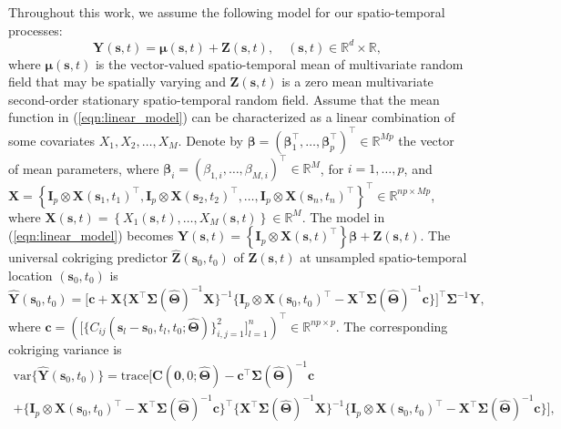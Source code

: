 \documentclass[12pt]{article}
\newcommand{\0}{\mathbf{0}}
\begin{document}
Throughout this work, we assume the following model for our spatio-temporal processes:
\begin{equation} \label{eqn:linear_model}
\mathbf{Y}(\mathbf{s},t) = \boldsymbol{\mu}(\mathbf{s}, t) + \mathbf{Z}(\mathbf{s},t),\quad (\mathbf{s},t)\in \mathbb{R}^d\times \mathbb{R},
\end{equation}
where $\boldsymbol{\mu}(\mathbf{s}, t)$ is the vector-valued spatio-temporal mean of multivariate random field that may be spatially varying and $\mathbf{Z}(\mathbf{s},t)$ is a zero mean multivariate second-order stationary spatio-temporal random field. Assume that the mean function in (\ref{eqn:linear_model}) can be characterized as a linear combination of some covariates $X_1, X_2, \ldots, X_M$. Denote by $\boldsymbol{\beta} = (\boldsymbol{\beta}_1^{\top}, \ldots, \boldsymbol{\beta}_p^{\top})^{\top} \in \mathbb{R}^{Mp}$ the vector of mean parameters, where $\boldsymbol{\beta}_i = (\beta_{1, i}, \ldots, \beta_{M, i})^{\top} \in \mathbb{R}^{M}$, for $i = 1, \ldots, p$, and $\mathbf{X} = \left\{ \mathbf{I}_p \otimes  \mathbf{X}(\mathbf{s}_1, t_1)^{\top}, \mathbf{I}_p \otimes \mathbf{X}(\mathbf{s}_2, t_2)^{\top}, \ldots, \mathbf{I}_p \otimes \mathbf{X}(\mathbf{s}_n, t_n)^{\top} \right\}^{\top} \in \mathbb{R}^{np\times  Mp}$, where $\mathbf{X}(\mathbf{s}, t) = \left\{X_1(\mathbf{s}, t), \ldots, X_M(\mathbf{s}, t) \right\}  \in \mathbb{R}^{M}$. The model in (\ref{eqn:linear_model}) becomes $\mathbf{Y}(\mathbf{s}, t) = \left\{  \mathbf{I}_p \otimes \mathbf{X}(\mathbf{s}, t)^{\top} \right\} \boldsymbol{\beta} + \mathbf{Z}(\mathbf{s},t). $ 
The universal cokriging predictor $\hat{\mathbf{Z}}(\mathbf{s}_0, t_0)$ of $\mathbf{Z}(\mathbf{s}, t)$ at unsampled spatio-temporal location $(\mathbf{s}_0, t_0)$ is 
\begin{equation*}
\hat{\mathbf{Y}}(\mathbf{s}_0, t_0) = \big[ \mathbf{c} + \mathbf{X} \{ \mathbf{X}^{\top} \boldsymbol{\Sigma}(\hat{\boldsymbol{\Theta}})^{-1} \mathbf{X} \}^{-1} \{ \mathbf{I}_p \otimes \mathbf{X}(\mathbf{s}_0, t_0)^{\top} -  \mathbf{X}^{\top} \boldsymbol{\Sigma}(\hat{\boldsymbol{\Theta}})^{-1} \mathbf{c} \} \big]^{\top} \boldsymbol{\Sigma}^{-1} \mathbf{Y},
\end{equation*}
where $\mathbf{c} =  ( \big[ \big\{ C_{ij} (\mathbf{s}_{l} - \mathbf{s}_{0}, t_{l}, t_{0}; \hat{\boldsymbol{\Theta}}) \big\}_{i,j = 1}^{2} \big]_{l= 1}^{n} )^{\top} \in \mathbb{R}^{np \times p}$. The corresponding cokriging variance is 
\begin{multline*}
\text{var} \{\hat{\mathbf{Y}}(\mathbf{s}_0, t_0) \}  = \text{trace}[\mathbf{C}(\mathbf{0}, 0; \hat{\boldsymbol{\Theta}}) - \mathbf{c}^{\top} \boldsymbol{\Sigma}(\hat{\boldsymbol{\Theta}})^{-1} \mathbf{c} \\
+ \{ \mathbf{I}_p \otimes \mathbf{X}(\mathbf{s}_0, t_0)^{\top} - \mathbf{X}^{\top} \boldsymbol{\Sigma}(\hat{\boldsymbol{\Theta}})^{-1}  \mathbf{c} \}^{\top} \{ \mathbf{X}^{\top} \boldsymbol{\Sigma}(\hat{\boldsymbol{\Theta}})^{-1} \mathbf{X} \}^{-1} \{ \mathbf{I}_p \otimes \mathbf{X}(\mathbf{s}_0, t_0)^{\top} - \mathbf{X}^{\top} \boldsymbol{\Sigma}(\hat{\boldsymbol{\Theta}})^{-1}  \mathbf{c} \} ],
\end{multline*}
\end{document}
